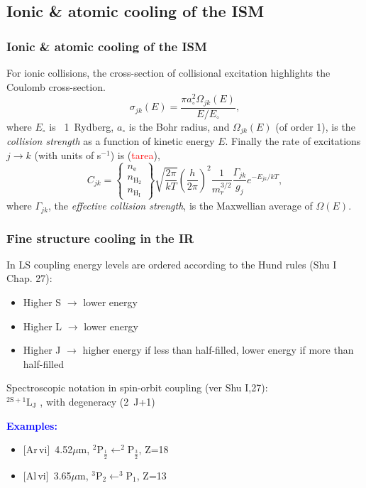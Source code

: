 \subsection{Ionic \& atomic  cooling of the ISM}
 \begin{frame}\frametitle{Ionic  \& atomic  cooling of the ISM}

For ionic collisions, the cross-section of collisional excitation
highlights the Coulomb cross-section.
\[ \sigma_{jk}(E)=\frac{\pi a_{\circ}^{2}  \Omega_{jk}(E)}{E/E_{\circ}}, \]
where $E_{\circ}$ is ~1~Rydberg, $a_{\circ}$ is the Bohr radius, and
$\Omega_{jk}(E)$ (of order 1), is the {\em collision strength} as a
function of  kinetic energy $E$. Finally the rate of excitations $j
\rightarrow k$ (with units of s$^{-1}$) is (\textcolor{red}{tarea}),
\[
C_{jk}= \left\{ \begin{array}{c} n_\mathrm{e} \\ n_\mathrm{H_2} \\
n_\mathrm{H_I} \end{array} \right\} {\sqrt{\frac{2\pi}{kT}}}
{\left(\frac{h}{2\pi}\right)}^{2}
\frac{1}{m_r^{3/2}} \frac{\Gamma_{jk}}{g_{j}} e^{-E_{jk}/kT},
\] where  $\Gamma_{jk}$,  the   {\em  effective collision strength},
is the Maxwellian average of $\Omega(E)$.


\end{frame} \begin{frame}\frametitle{Fine structure cooling in the IR}

In LS coupling energy levels are ordered according to the Hund rules
(Shu I Chap. 27):

\begin{itemize}
\item Higher S $\rightarrow$ lower energy
\item Higher L $\rightarrow$ lower energy
\item Higher J $\rightarrow$ higher energy if less than half-filled,
lower energy if more than half-filled
\end{itemize}

Spectroscopic notation in spin-orbit coupling (ver Shu
I,27):
\LARGE \\ \medskip
\( \mathrm{^{2S+1} L_J   } \) \normalsize, with degeneracy (2~J+1)

\textcolor{blue}{\bf Examples:} 
\begin{itemize}
\item  $[$Ar\,{\sc vi}$]$~4.52$\mu$m, $^2$P$_\frac{1}{2}\leftarrow ^2$P$_\frac{3}{2}$, Z=18
\item  $[$Al\,{\sc vi}$]$~3.65$\mu$m, $^3$P$_2\leftarrow ^3$P$_1$, Z=13
\end{itemize}



\end{frame}
